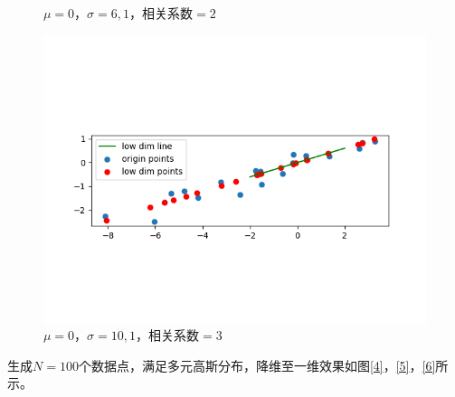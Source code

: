\begin{figure}[htbp]
\begin{minipage}[t]{0.3\linewidth}
        \caption{$\mu=0$，$\sigma=6,1$，相关系数$=2$}
        \label{2}
    \end{minipage}
    \begin{minipage}[t]{0.3\linewidth}
        \centering
        \includegraphics[width=\textwidth]{figures/Figure_6.png}
        \caption{$\mu=0$，$\sigma=10,1$，相关系数$=3$}
        \label{3}
    \end{minipage}
\end{figure}

生成$N=100$个数据点，满足多元高斯分布，降维至一维效果如图\ref{4}，\ref{5}，\ref{6}所示。

